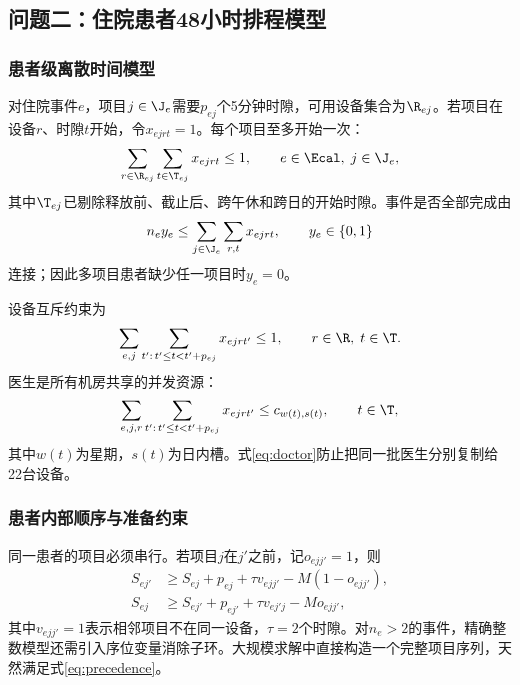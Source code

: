 \subsection{问题二：住院患者48小时排程模型}

\subsubsection{患者级离散时间模型}

对住院事件$e$，项目$j\in\J_e$需要$p_{ej}$个5分钟时隙，可用设备集合为$\R_{ej}$。若项目在设备$r$、时隙$t$开始，令$x_{ejrt}=1$。每个项目至多开始一次：
\begin{equation}
  \sum_{r\in\R_{ej}}\sum_{t\in\T_{ej}}x_{ejrt}\leq1,
  \qquad e\in\Ecal,\;j\in\J_e,
  \label{eq:once}
\end{equation}
其中$\T_{ej}$已剔除释放前、截止后、跨午休和跨日的开始时隙。事件是否全部完成由
\begin{equation}
  n_e y_e\leq\sum_{j\in\J_e}\sum_{r,t}x_{ejrt},
  \qquad y_e\in\{0,1\}
  \label{eq:complete}
\end{equation}
连接；因此多项目患者缺少任一项目时$y_e=0$。

设备互斥约束为
\begin{equation}
  \sum_{e,j}\sum_{t':\,t'\leq t<t'+p_{ej}}x_{ejrt'}\leq1,
  \qquad r\in\R,\;t\in\T.
  \label{eq:room}
\end{equation}
医生是所有机房共享的并发资源：
\begin{equation}
  \sum_{e,j,r}\sum_{t':\,t'\leq t<t'+p_{ej}}x_{ejrt'}\leq c_{w(t),s(t)},
  \qquad t\in\T,
  \label{eq:doctor}
\end{equation}
其中$w(t)$为星期，$s(t)$为日内槽。式\eqref{eq:doctor}防止把同一批医生分别复制给22台设备。

\subsubsection{患者内部顺序与准备约束}

同一患者的项目必须串行。若项目$j$在$j'$之前，记$o_{ejj'}=1$，则
\begin{align}
  S_{ej'}&\geq S_{ej}+p_{ej}+\tau v_{ejj'}-M(1-o_{ejj'}),\\
  S_{ej}&\geq S_{ej'}+p_{ej'}+\tau v_{ej'j}-Mo_{ejj'},
  \label{eq:precedence}
\end{align}
其中$v_{ejj'}=1$表示相邻项目不在同一设备，$\tau=2$个时隙。对$n_e>2$的事件，精确整数模型还需引入序位变量消除子环。大规模求解中直接构造一个完整项目序列，天然满足式\eqref{eq:precedence}。

